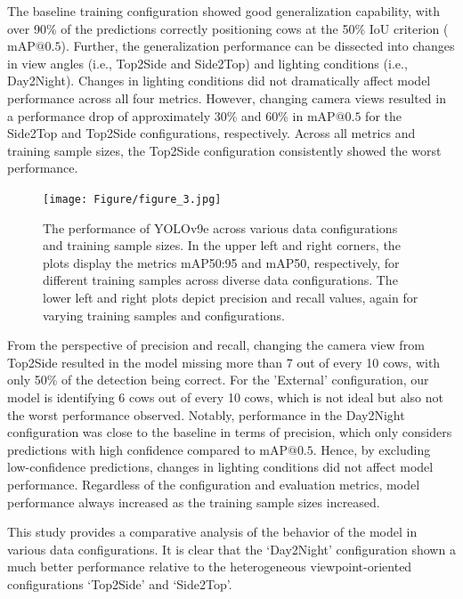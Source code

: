 The baseline training configuration showed good generalization capability, with over 90\% of the predictions correctly positioning cows at the 50\% IoU criterion ($\text{mAP@{0.5}}$). Further, the generalization performance can be dissected into changes in view angles (i.e., Top2Side and Side2Top) and lighting conditions (i.e., Day2Night). Changes in lighting conditions did not dramatically affect model performance across all four metrics. However, changing camera views resulted in a performance drop of approximately 30\% and 60\% in $\text{mAP@{0.5}}$ for the Side2Top and Top2Side configurations, respectively. Across all metrics and training sample sizes, the Top2Side configuration consistently showed the worst performance.
\begin{figure}[h]
    \centering
    \texttt{[image: Figure/figure\_3.jpg]}
    \caption{The performance of YOLOv9e across various data configurations and training sample sizes. In the upper left and right corners, the plots display the metrics mAP50:95 and mAP50, respectively, for different training samples across diverse data configurations. The lower left and right plots depict precision and recall values, again for varying training samples and configurations.}
    \label{fig:schemes}
    \end{figure}
From the perspective of precision and recall, changing the camera view from Top2Side resulted in the model missing more than 7 out of every 10 cows, with only 50\% of the detection being correct. For the 'External' configuration, our model is identifying 6 cows out of every 10 cows, which is not ideal but also not the worst performance observed. Notably, performance in the Day2Night configuration was close to the baseline in terms of precision, which only considers predictions with high confidence compared to $\text{mAP@{0.5}}$. Hence, by excluding low-confidence predictions, changes in lighting conditions did not affect model performance. Regardless of the configuration and evaluation metrics, model performance always increased as the training sample sizes increased.

This study  provides a comparative analysis of the behavior of the model in various data configurations. It is clear that the `Day2Night' configuration shown a much better performance relative to the heterogeneous viewpoint-oriented configurations `Top2Side' and `Side2Top'.

